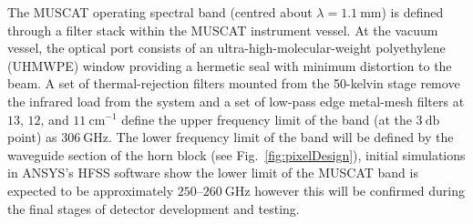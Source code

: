 \documentclass{spie}
\begin{document}
\par 
The MUSCAT operating spectral band (centred about $\lambda = 1.1~\si{\milli\metre}$) is defined through a filter stack within the MUSCAT instrument vessel. At the vacuum vessel, the optical port consists of an ultra-high-molecular-weight polyethylene (UHMWPE) window providing a hermetic seal with minimum distortion to the beam. A set of thermal-rejection filters mounted from the 50-kelvin stage remove the infrared load from the system and a set of low-pass edge metal-mesh filters at $13$, $12$, and $11~\si{\centi\metre^{-1}}$ define the upper frequency limit of the band (at the $3~\si{\decibel}$ point) as $306~\si{\giga\hertz}$. The lower frequency limit of the band will be defined by the waveguide section of the horn block (see Fig.~\ref{fig:pixelDesign}), initial simulations in ANSYS's HFSS software show the lower limit of the MUSCAT band is expected to be approximately $250\mbox{--}260~\si{\giga\hertz}$ however this will be confirmed during the final stages of detector development and testing.
%
\end{document}
